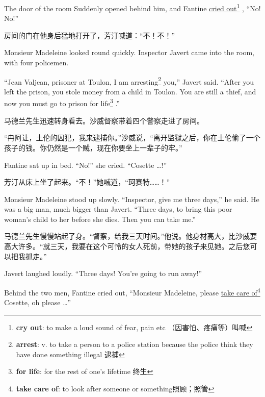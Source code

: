 \documentclass[fontset=ubuntu, zihao=5]{ctexart}
\begin{document}
\begin{paracol}{2}
  \switchcolumn*

  The door of the room Suddenly opened behind him, and Fantine \uline{cried out}\footnote{\textbf{cry out}: to make a loud sound of fear, pain etc （因害怕、疼痛等）叫喊}
  , ``No! No!''

  \switchcolumn

  房间的门在他身后猛地打开了，芳汀喊道：“不！不！”

  \switchcolumn*

  Monsieur Madeleine looked round quickly. Inspector Javert came into the room, with four policemen.


  ``Jean Valjean, prisoner at Toulon, I am arresting\footnote{\textbf{arrest}:  v. to take a person to a police station because the police think they have done something illegal 逮捕}
  you,'' Javert said. ``After you left the prison, you stole money from a child in Toulon. You are still a thief, and now you must go to prison for life\footnote{\textbf{for life}: for the rest of one's lifetime 终生}
  .''

  \switchcolumn

  马德兰先生迅速转身看去。沙威督察带着四个警察走进了房间。


  “冉阿让，土伦的囚犯，我来逮捕你。”沙威说，“离开监狱之后，你在土伦偷了一个孩子的钱。你仍然是一个贼，现在你要坐上一辈子的牢。”

  \switchcolumn*

  Fantine sat up in bed. ``No!'' she cried. ``Cosette \ldots{}!''

  \switchcolumn

  芳汀从床上坐了起来。“不！”她喊道，“珂赛特……！”

  \switchcolumn*

  Monsieur Madeleine stood up slowly. ``Inspector, give me three days,'' he said. He was a big man, much bigger than Javert. ``Three days, to bring this poor woman's child to her before she dies. Then you can take me.''

  \switchcolumn

  马德兰先生慢慢站起了身。“督察，给我三天时间。”他说。他身材高大，比沙威要高大许多。“就三天，我要在这个可怜的女人死前，带她的孩子来见她。之后您可以把我抓走。”

  \switchcolumn*

  Javert laughed loudly. ``Three days! You're going to run away!''

  Behind the two men, Fantine cried out, ``Monsieur Madeleine, please
  \uline{take care of}\footnote{\textbf{take care of}: to look after someone or
    something照顾；照管} Cosette, oh please \ldots{}''


\end{paracol}
\end{document}

